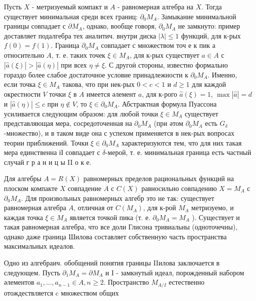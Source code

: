 \documentclass[10pt]{article}
\begin{document}
Пусть $X$ - метризуемый компакт и $A$ - равномерная алгебра на $X$. Тогда существует минимальная среди всех границ: $\partial_{0} M_{A}$. Замыкание минимальной границы совпадает с $\partial M_{A}$, однако, вообще говоря, $\partial_{0} M_{A}$ не замкнуто: пример доставляет подалгебра тех аналитич. внутри диска $|\lambda| \leqslant 1$ функций, для к-рых $f(0)=f(1)$. Граница $\partial_{0} M_{A}$ совпадает с множеством точ е к пик а относительно $A$, т. е. таких точек $\xi \in M_{A}$, для к-рых существует $a \in A$ с $|\hat{a}(\xi)|>|\hat{a}(\eta)|$ при всех $\eta \neq \xi$. С другоӥ стороны, известно формально гораздо более слабое достаточное условие принадлежности к $\partial_{0} M_{A}$. Именно, если точка $\xi \in M_{A}$ такова, что при нек-рых $0<c<1$ и $d \geqslant 1$ для каждой окрестности $V$ точки $\xi$ в $A$ имеется әлемент $a$, для к-рого $\hat{a}(\xi)=1$, $\max |\hat{a}|=d$ и $|\hat{a}(\eta)| \leqslant c$ при $\eta \notin V$, то $\xi \in \partial_{0} M_{A}$. Абстрактная формула Пуассона усиливается следующим образом: для любой точки $\xi \in M_{A}$ существует представляющая мера, сосредоточенная на $\partial_{0} M_{A}$ (при әтом $\partial_{0} M_{A}$ есть $G_{\delta}$-множество), и в таком виде она с успехом применяется в нек-рых вопросах теории приближений. Точки $\xi \in \partial_{0} M_{A}$ характеризуются тем, что для них такая мера единственна іІ совпадает с $\delta$-мерой, т. е. минимальная граница есть частный случай г р а н и ц ы II о к е.



Для алгебры $A=R(X)$ равномерных пределов рациональных функций на плоском компакте $X$ совпадение $A$ с $C(X)$ равносильно совпадению $X=M_{A}$ с $\partial_{0} M_{A}$. Для произвольных равномерных алгебр это не так: существует равномерная алгебра $A$, отличная от $C\left(M_{A}\right)$, для к-рой $M_{A}$ метризуемо, и каждая точка $\xi \in M_{A}$ является точкой пика (т. е. $\partial_{0} M_{A}=M_{A}$ ). Существует и такая равномерная алгебра, что все доли Глисона тривиальны (одноточечны), однако даже граница Шилова составляет собственную часть пространства максимальных идеалов.



Одно из алгебраич. обобщений понятия границы IIилова заключается в следующем. Пусть $\partial_{1} M_{A}=\partial M_{A}$ и I - замкнутый идеал, порожденный набором әлементов $a_{1}, \ldots, a_{n-1} \in A, n \geqslant 2$. Пространство $M_{A / I}$ естественно отождествляется $\mathrm{c}$ множеством общих
\end{document}
